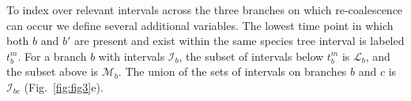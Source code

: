 \documentclass[11pt]{article}
\begin{document}







To index over relevant intervals across the three branches on which re-coalescence
can occur we define several additional variables. The lowest time point in which both 
$b$ and $b'$ are present and exist within the same species tree interval is labeled 
$t_b^m$. For a branch $b$ with intervals $\mathcal{I}_b$, the subset of intervals 
below $t_b^m$ is $\mathcal{L}_b$, and the subset above is $\mathcal{M}_b$. 
The union of the sets of intervals on branches $b$ and $c$ is $\mathcal{I}_{bc}$
(Fig.~\ref{fig:fig3}e).
\end{document}
